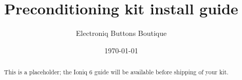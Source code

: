 \documentclass[superscriptaddress,onecolumn,floatfix]{revtex4-2}
\begin{document}
                            
\begin{abstract}
  This is a placeholder; the Ioniq 6 guide will be available before shipping of your kit. 
\end{abstract}
\title{Preconditioning kit install guide}
\author{Electroniq Buttons Boutique}
\date{\today}

\maketitle
\end{document}
